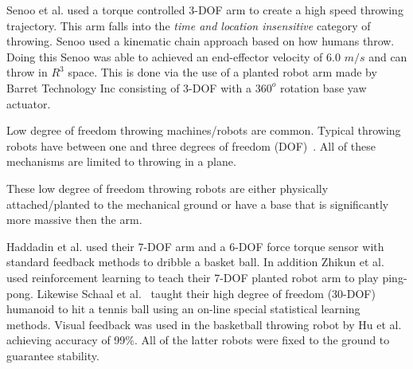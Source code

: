 

Senoo et al.\cite{4651142} used a torque controlled 3-DOF arm to create a high speed throwing trajectory.
This arm falls into the \textit{time and location insensitive} category of throwing.
Senoo used a kinematic chain approach based on how humans throw.  
Doing this Senoo was able to achieved an end-effector velocity of 6.0 $m/s$ and can throw in $R^3$ space.
This is done via the use of a planted robot arm made by Barret Technology Inc consisting of 3-DOF with a $360^o$ rotation base yaw actuator.%
 

 

Low degree of freedom throwing machines/robots are common.  
Typical throwing robots have between one and three degrees of freedom (DOF)~\cite{509405, Lynch97dynamicnonprehensile, 5152525, 509335, springerlink:10.1007/s10015-006-0401-0,throw5347013,throw6386000,throw5152438,throw5423199,throw6224565,throw6347845,throw6071965}.
All of these mechanisms are limited to throwing in a plane.   



These low degree of freedom throwing robots are either physically attached/planted to the mechanical ground or have a base that is significantly more massive then the arm.  



Haddadin et al.\cite{6094757} used their 7-DOF arm and a 6-DOF force torque sensor with standard feedback methods to dribble a basket ball.  
In addition Zhikun et al.~\cite{6094892} used reinforcement learning to teach their 7-DOF planted robot arm to play ping-pong.  
Likewise Schaal et al.~\cite{schaal01/BIRG} taught their high degree of freedom (30-DOF) humanoid to hit a tennis ball using an on-line special statistical learning methods.
Visual feedback was used in the basketball throwing robot by Hu et al.~\cite{5649335} achieving accuracy of 99\%.  
All of the latter robots were fixed to the ground to guarantee stability.

